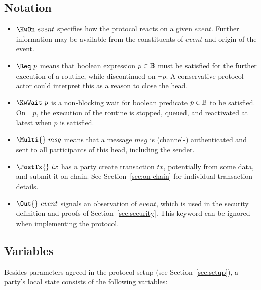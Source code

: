 \subsection{Notation}
\begin{itemize}
	\item $\KwOn~event$ specifies how the protocol reacts on a given $event$.
	      Further information may be available from the constituents of $event$
	      and origin of the event.
	\item $\Req~p$ means that boolean expression $p \in \mathbb{B}$ must be satisfied
	      for the further execution of a routine, while discontinued on $\neg p$.
	      A conservative protocol actor could interpret this as a reason to close
	      the head.
	\item $\KwWait~p$ is a non-blocking wait for boolean predicate $p \in \mathbb{B}$
	      to be satisfied. On $\neg p$, the execution of the routine is stopped,
	      queued, and reactivated at latest when $p$ is satisfied.
	\item $\Multi{}~msg$ means that a message $msg$ is (channel-) authenticated
	      and sent to all participants of this head, including the sender.
	\item $\PostTx{}~tx$ has a party create transaction $tx$, potentially from
	      some data, and submit it on-chain. See Section~\ref{sec:on-chain} for
	      individual transaction details.
	\item $\Out{}~event$ signals an observation of $event$, which is used in the
	      security definition and proofs of Section~\ref{sec:security}. This
	      keyword can be ignored when implementing the protocol.
\end{itemize}

\subsection{Variables}

Besides parameters agreed in the protocol setup (see Section~\ref{sec:setup}), a
party's local state consists of the following variables:

